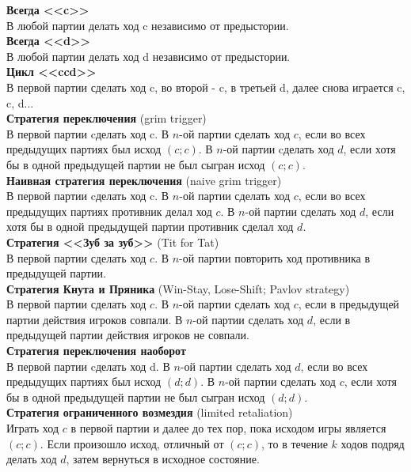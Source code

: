 \documentclass[pdftex,12pt,a4paper]{article}
\begin{document}
{\bf Всегда <<c>>} \\
В любой партии делать ход c независимо от предыстории. \\
{\bf Всегда <<d>>} \\
В любой партии делать ход d независимо от предыстории. \\
{\bf Цикл <<ccd>>} \\
В первой партии сделать ход c, во второй - c, в третьей d, далее снова играется c, c, d... \\
{\bf Стратегия переключения} (grim trigger)\\
В первой партии cделать ход c. В $n$-ой партии сделать ход $c$, если во всех предыдущих партиях был исход $(c;c)$. В $n$-ой партии cделать ход $d$, если хотя бы в одной предыдущей партии не был сыгран исход $(c;c)$. \\
{\bf Наивная стратегия переключения} (naive grim trigger)\\
В первой партии cделать ход c. В $n$-ой партии сделать ход $c$, если во всех предыдущих партиях противник делал ход $c$. В $n$-ой партии сделать ход $d$, если хотя бы в одной предыдущей партии противник сделал ход $d$. \\
{\bf Стратегия <<Зуб за зуб>>} (Tit for Tat)\\
В первой партии сделать ход $c$. В $n$-ой партии повторить ход противника в предыдущей партии. \\
{\bf Стратегия Кнута и Пряника} (Win-Stay, Lose-Shift; Pavlov strategy)\\
В первой партии сделать ход $c$. В $n$-ой партии сделать ход  $c$, если в предыдущей партии действия игроков совпали. В $n$-ой партии сделать ход  $d$, если в предыдущей партии действия игроков не совпали. \\
{\bf Стратегия переключения наоборот}\\
В первой партии cделать ход d. В $n$-ой партии сделать ход $d$, если во всех предыдущих партиях был исход $(d;d)$. В $n$-ой партии сделать ход $c$, если хотя бы в одной предыдущей партии не был сыгран исход $(d;d)$. \\
{\bf Стратегия ограниченного возмездия} (limited retaliation)\\
Играть ход  $c$ в первой партии и далее до тех пор, пока исходом игры является $(c;c)$. Если произошло исход, отличный от $(c;c)$, то в течение  $k$  ходов подряд делать ход $d$, затем вернуться в исходное состояние. \\ 
\end{document}
